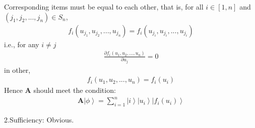\documentclass[%
 reprint,
 amsmath,amssymb,
pra,
]{revtex4-1}
\begin{document}
Corresponding items must be equal to each other, that is, for all $i \in \left[1, n\right]$ and $\left(j_1, j_2, ..., j_n\right)\in S_n$, 
\begin{align*}
	f_{i}\left(u_{j_1}, u_{j_2}, ..., u_{j_n}\right) = f_{i}\left(u_{j_i}, u_{j_i}, ..., u_{j_i}\right)
\end{align*}
i.e., for any $i\neq j$
\begin{align*}
	\frac{\partial f_i\left(u_1, u_2, ..., u_n\right)}{\partial u_j} = 0
\end{align*}
in other, 
\begin{align*}
	f_i\left(u_1, u_2, ...,u_n\right) = f_i\left(u_i\right)
\end{align*}
Hence $\bm{A}$ should meet the condition: 
\begin{align*}
	\bm{A}\left|\phi\right\rangle = \sum_{i=1}^n \left|i\right\rangle\left|u_i\right\rangle\left|f_{i}\left(u_i\right)\right\rangle
\end{align*}

2.Sufficiency: Obvious.


\end{document}
